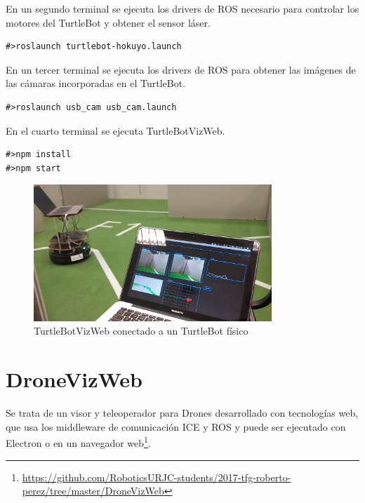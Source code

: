 En un segundo terminal se ejecuta los drivers de ROS necesario para controlar los motores del TurtleBot y obtener el sensor láser.

\begin{lstlisting}[caption= Ejecución de los drivers para los motores y el láser]
#>roslaunch turtlebot-hokuyo.launch
\end{lstlisting}

En un tercer terminal se ejecuta los drivers de ROS para obtener las imágenes de las cámaras incorporadas en el TurtleBot.

\begin{lstlisting}[caption= Ejecución del driver de ROS para las cámaras]
#>roslaunch usb_cam usb_cam.launch
\end{lstlisting}

En el cuarto terminal se ejecuta TurtleBotVizWeb.

\begin{lstlisting}[caption= Ejecución con Electron, label=cod.turtleelectronreal]
#>npm install
#>npm start
\end{lstlisting}

\begin{figure}[H]
  \begin{center}
    \includegraphics[width=0.8\textwidth]{figures/Turtlebotreal.png}
    		\caption{TurtleBotVizWeb conectado a un TurtleBot físico}
		\label{fig.TurtleBotvizreal}
		\end{center}
\end{figure}

\section{DroneVizWeb}
Se trata de un visor y teleoperador para Drones desarrollado con tecnologías web, que usa los middleware de comunicación ICE y ROS y puede ser ejecutado con Electron o en un navegador web\footnote{\url{https://github.com/RoboticsURJC-students/2017-tfg-roberto-perez/tree/master/DroneVizWeb}}.

